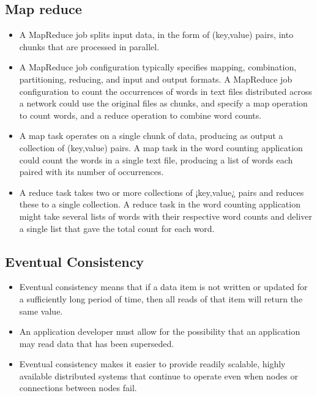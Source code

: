 \documentclass[10pt]{article}
\begin{document}
      \subsection*{Map reduce}
        \begin{itemize}
          \item A MapReduce job splits input data, in the form of (key,value) pairs, into chunks that are processed in parallel.\

          \item A MapReduce job configuration typically specifies mapping, combination, partitioning, reducing, and input and output formats. A MapReduce job configuration to count the occurrences of words in text files distributed across a network could use the original files as chunks, and specify a map operation to count words, and a reduce operation to combine word counts.\

          \item A map task operates on a single chunk of data, producing as output a collection of (key,value) pairs. A map task in the word counting application could count the words in a single text file, producing a list of words each paired with its number of occurrences.\

          \item A reduce task takes two or more collections of ¡key,value¿ pairs and reduces these to a single collection. A reduce task in the word counting application might take several lists of words with their respective word counts and deliver a single list that gave the total count for each word.
        \end{itemize}

      \subsection*{Eventual Consistency}
        \begin{itemize}
          \item Eventual consistency means that if a data item is not written or updated for a sufficiently long period of time, then all reads of that item will return the same value.
          \item An application developer must allow for the possibility that an application may read data that has been superseded.
          \item Eventual consistency makes it easier to provide readily scalable, highly available distributed systems that continue to operate even when nodes or connections between nodes fail.  
        \end{itemize}
\end{document}
